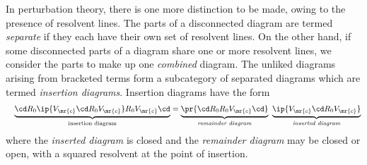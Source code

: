 \documentclass[11pt,fleqn]{article}
\numberwithin{equation}{section}
\begin{document}
\begin{dfn}
In perturbation theory, there is one more distinction to be made, owing to the presence of resolvent lines.
The parts of a disconnected diagram are termed \textit{separate} if they each have their own set of resolvent lines.
On the other hand, if some disconnected parts of a diagram share one or more resolvent lines, we consider the parts to make up one \textit{combined} diagram. 
The unliked diagrams arising from bracketed terms form a subcategory of separated diagrams which are termed \textit{insertion diagrams}.
Insertion diagrams have the form
\begin{align*}
&&
  \underset{
    \text{insertion diagram}
  }{\underbrace{
    \cd R_0\ip{V_\mr{c}\cd R_0V_\mr{c}}R_0V_\mr{c}\cd 
  }}
=
  \underset{
    \textit{remainder diagram}
  }{\underbrace{
    \pr{
      \cd R_0R_0V_\mr{c}\cd
    }
  }}\hspace{5pt}
  \underset{
    \textit{inserted diagram}
  }{\underbrace{
    \ip{V_\mr{c}\cd R_0V_\mr{c}}
  }}
\end{align*}
where the \textit{inserted diagram} is closed and the \textit{remainder diagram} may be closed or open, with a squared resolvent at the point of insertion.
\end{dfn}
\end{document}
